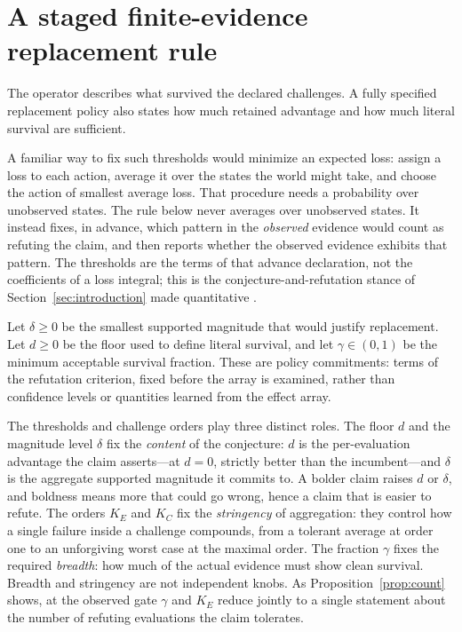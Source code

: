 \documentclass[11pt]{article}
\theoremstyle{remark}
\begin{document}
\section{A staged finite-evidence replacement rule}
\label{sec:decision}

The operator describes what survived the declared challenges. A fully
specified replacement policy also states how much retained advantage and how
much literal survival are sufficient.

A familiar way to fix such thresholds would minimize an expected loss: assign a
loss to each action, average it over the states the world might take, and choose
the action of smallest average loss. That procedure needs a probability over
unobserved states. The rule below never averages over unobserved states. It
instead fixes, in advance, which pattern in the \emph{observed} evidence would
count as refuting the claim, and then reports whether the observed evidence
exhibits that pattern. The thresholds are the terms of that advance declaration,
not the coefficients of a loss integral; this is the conjecture-and-refutation
stance of Section~\ref{sec:introduction} made quantitative
\cite{popper1959logic,popper1963conjectures}.

Let $\delta\geq0$ be the smallest supported magnitude that would justify
replacement. Let $d\geq0$ be the floor used to define literal survival, and
let $\gamma\in(0,1)$ be the minimum acceptable survival fraction. These are
policy commitments: terms of the refutation criterion, fixed before the array
is examined, rather than confidence levels or quantities learned from the
effect array.

The thresholds and challenge orders play three distinct roles. The floor $d$
and the magnitude level $\delta$ fix the \emph{content} of the conjecture: $d$
is the per-evaluation advantage the claim asserts---at $d=0$, strictly better
than the incumbent---and $\delta$ is the aggregate supported magnitude it
commits to. A bolder claim raises $d$ or $\delta$, and boldness means more that
could go wrong, hence a claim that is easier to refute. The orders $K_E$ and
$K_C$ fix the \emph{stringency} of aggregation: they control how a single
failure inside a challenge compounds, from a tolerant average at order one to an
unforgiving worst case at the maximal order. The fraction $\gamma$ fixes the
required \emph{breadth}: how much of the actual evidence must show clean
survival. Breadth and stringency are not independent knobs. As
Proposition~\ref{prop:count} shows, at the observed gate $\gamma$ and $K_E$
reduce jointly to a single statement about the number of refuting evaluations
the claim tolerates.
\end{document}
